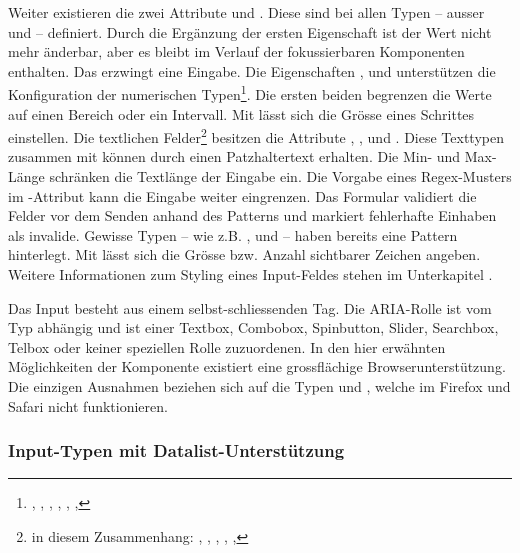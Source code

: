 Weiter existieren die zwei Attribute  und . 
Diese sind bei allen Typen – ausser  und  – definiert. 
Durch die Ergänzung der ersten Eigenschaft ist der Wert nicht mehr änderbar, aber es bleibt im Verlauf der fokussierbaren Komponenten enthalten. 
Das  erzwingt eine Eingabe. 
Die Eigenschaften ,  und  unterstützen die Konfiguration der numerischen Typen\footnote{
    , , , , , , 
}. 
Die ersten beiden begrenzen die Werte auf einen Bereich oder ein Intervall. 
Mit  lässt sich die Grösse eines Schrittes einstellen. 
Die textlichen Felder\footnote{
    in diesem Zusammenhang: , , , , , 
} besitzen die Attribute , ,  und . 
Diese Texttypen zusammen mit  können durch  einen Patzhaltertext erhalten. 
Die Min- und Max-Länge schränken die Textlänge der Eingabe ein. 
Die Vorgabe eines Regex-Musters im -Attribut kann die Eingabe weiter eingrenzen. 
Das Formular validiert die Felder vor dem Senden anhand des Patterns und markiert fehlerhafte Einhaben als invalide. 
Gewisse Typen – wie z.B. ,  und  – haben bereits eine Pattern hinterlegt. 
Mit  lässt sich die Grösse bzw. Anzahl sichtbarer Zeichen angeben. 
Weitere Informationen zum Styling eines Input-Feldes stehen im Unterkapitel \textbf{}. 

Das Input besteht aus einem selbst-schliessenden Tag. 
Die ARIA-Rolle ist vom Typ abhängig und ist einer Textbox, Combobox, Spinbutton, Slider, Searchbox, Telbox oder keiner speziellen Rolle zuzuordenen.  
In den hier erwähnten Möglichkeiten der Komponente existiert eine grossflächige Browserunterstützung. 
Die einzigen Ausnahmen beziehen sich auf die Typen  und , welche im Firefox und Safari nicht funktionieren. 


\subsubsection{{\color{dgray} Input-Typen mit Datalist-Unterstützung}}
\label{sec:inputTypesDatalist}

